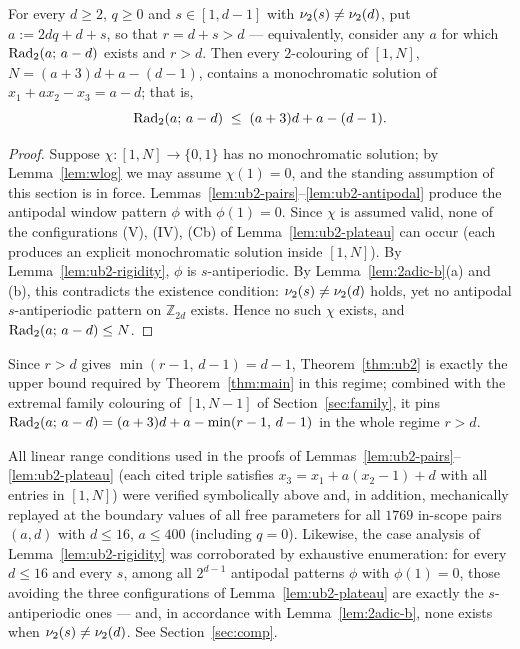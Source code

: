 \begin{theorem}\label{thm:ub2}
For every $d \ge 2$, $q \ge 0$ and $s \in [1, d-1]$ with
$\nu_2(s) \ne \nu_2(d)$, put $a := 2dq + d + s$, so that $r = d + s > d$ ---
equivalently, consider any $a$ for which $\mathrm{Rad}_2(a;\, a-d)$ exists
and $r > d$. Then every $2$-colouring of $[1, N]$,
$N = (a+3)d + a - (d-1)$, contains a monochromatic solution of
$x_1 + a x_2 - x_3 = a - d$; that is,
\[
\mathrm{Rad}_2(a;\, a - d) \;\le\; (a+3)d + a - (d-1).
\]
\end{theorem}

\begin{proof}
Suppose $\chi \colon [1, N] \to \{0,1\}$ has no monochromatic solution;
by Lemma~\ref{lem:wlog} we may assume $\chi(1) = 0$, and the standing
assumption of this section is in force.
Lemmas~\ref{lem:ub2-pairs}--\ref{lem:ub2-antipodal} produce the antipodal
window pattern $\phi$ with $\phi(1) = 0$. Since $\chi$ is assumed valid,
none of the configurations (V), (IV), (Cb) of
Lemma~\ref{lem:ub2-plateau} can occur (each produces an explicit
monochromatic solution inside $[1, N]$). By
Lemma~\ref{lem:ub2-rigidity}, $\phi$ is $s$-antiperiodic. By
Lemma~\ref{lem:2adic-b}(a) and (b), this contradicts the existence
condition: $\nu_2(s) \ne \nu_2(d)$ holds, yet no antipodal
$s$-antiperiodic pattern on $\mathbb{Z}_{2d}$ exists. Hence no such
$\chi$ exists, and $\mathrm{Rad}_2(a;\, a - d) \le N$.
\end{proof}

Since $r > d$ gives $\min(r-1,\, d-1) = d - 1$, Theorem~\ref{thm:ub2} is
exactly the upper bound required by Theorem~\ref{thm:main} in this regime;
combined with the extremal family colouring of $[1, N-1]$ of
Section~\ref{sec:family}, it pins
$\mathrm{Rad}_2(a;\, a-d) = (a+3)d + a - \min(r-1,\, d-1)$ in the whole regime
$r > d$.

\begin{remark}
All linear range conditions used in the proofs of
Lemmas~\ref{lem:ub2-pairs}--\ref{lem:ub2-plateau} (each cited triple
satisfies $x_3 = x_1 + a(x_2 - 1) + d$ with all entries in $[1, N]$) were
verified symbolically above and, in addition, mechanically replayed at the
boundary values of all free parameters for all $1769$ in-scope pairs
$(a, d)$ with $d \le 16$, $a \le 400$ (including $q = 0$). Likewise, the
case analysis of Lemma~\ref{lem:ub2-rigidity} was corroborated by
exhaustive enumeration: for every $d \le 16$ and every $s$, among all
$2^{d-1}$ antipodal patterns $\phi$ with $\phi(1) = 0$, those avoiding the
three configurations of Lemma~\ref{lem:ub2-plateau} are exactly the
$s$-antiperiodic ones --- and, in accordance with
Lemma~\ref{lem:2adic-b}, none exists when $\nu_2(s) \ne \nu_2(d)$. See
Section~\ref{sec:comp}.
\end{remark}
